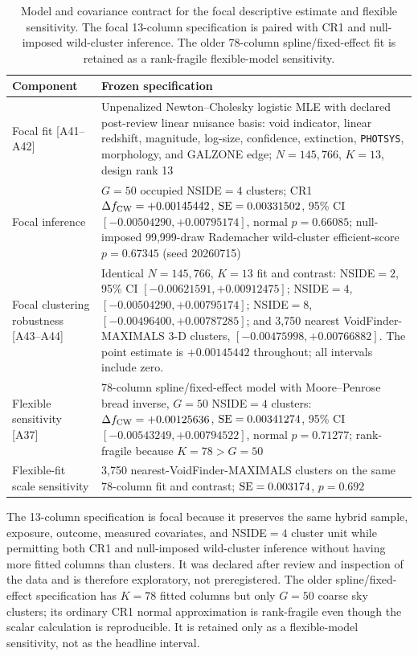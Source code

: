 \documentclass[twocolumn,linenumbers]{aastex702}
\begin{document}
\begin{table}[!t]
\caption{Model and covariance contract for the focal descriptive
estimate and flexible sensitivity. The focal 13-column specification is
paired with CR1 and null-imposed wild-cluster inference. The older
78-column spline/fixed-effect fit is retained as a rank-fragile
flexible-model sensitivity.}
\label{tab:focal_model_contract}
\begin{ruledtabular}
\begin{tabular}{p{}p{}}
Component & Frozen specification \\
\hline
Focal fit [A41--A42] & Unpenalized Newton--Cholesky logistic MLE with declared post-review linear nuisance basis: void indicator, linear redshift, magnitude, log-size, confidence, extinction, \texttt{PHOTSYS}, morphology, and GALZONE edge; $N=145{,}766$, $K=13$, design rank 13 \\
Focal inference & $G=50$ occupied NSIDE$=4$ clusters; CR1 $\Delta f_{\rm CW}=+0.00145442$, ${\rm SE}=0.00331502$, 95\% CI $[-0.00504290,+0.00795174]$, normal $p=0.66085$; null-imposed 99,999-draw Rademacher wild-cluster efficient-score $p=0.67345$ (seed 20260715) \\
Focal clustering robustness [A43--A44] & Identical $N=145{,}766$, $K=13$ fit and contrast: NSIDE$=2$, 95\% CI $[-0.00621591,+0.00912475]$; NSIDE$=4$, $[-0.00504290,+0.00795174]$; NSIDE$=8$, $[-0.00496400,+0.00787285]$; and 3,750 nearest VoidFinder-MAXIMALS 3-D clusters, $[-0.00475998,+0.00766882]$. The point estimate is $+0.00145442$ throughout; all intervals include zero. \\
Flexible sensitivity [A37] & 78-column spline/fixed-effect model with Moore--Penrose bread inverse, $G=50$ NSIDE$=4$ clusters: $\Delta f_{\rm CW}=+0.00125636$, ${\rm SE}=0.00341274$, 95\% CI $[-0.00543249,+0.00794522]$, normal $p=0.71277$; rank-fragile because $K=78>G=50$ \\
Flexible-fit scale sensitivity & 3,750 nearest-VoidFinder-MAXIMALS clusters on the same 78-column fit and contrast; ${\rm SE}=0.003174$, $p=0.692$ \\
\end{tabular}
\end{ruledtabular}
\end{table}

The 13-column specification is focal because it preserves the same hybrid
sample, exposure, outcome, measured covariates, and NSIDE$=4$ cluster unit
while permitting both CR1 and null-imposed wild-cluster inference without
having more fitted columns than clusters. It was declared after review and
inspection of the data and is therefore exploratory, not preregistered.
The older spline/fixed-effect specification has $K=78$ fitted columns but
only $G=50$ coarse sky clusters; its ordinary CR1 normal approximation is
rank-fragile even though the scalar calculation is reproducible. It is
retained only as a flexible-model sensitivity, not as the headline interval.
\end{document}

